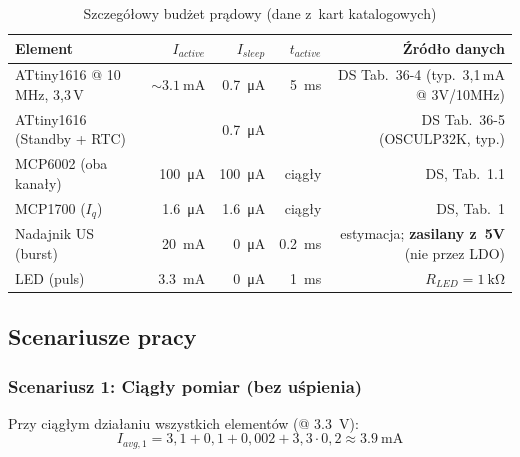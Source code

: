 \documentclass[a4paper,11pt]{article}
\begin{document}
\begin{table}[H]
    \centering
    \caption{Szczegółowy budżet prądowy (dane z~kart katalogowych)}
    \label{tab:moc_detail}
    \begin{tabular}{lrrrr}
        \toprule
        \textbf{Element} & \textbf{$I_{active}$} & \textbf{$I_{sleep}$}
            & \textbf{$t_{active}$} & \textbf{Źródło danych} \\
        \midrule
        ATtiny1616 @ 10\,MHz, 3{,}3\,V
            & ${\sim}\SI{3,1}{\milli\ampere}$
            & \SI{0,7}{\micro\ampere}
            & \SI{5}{\milli\second}
            & DS Tab.~36-4 (typ.\ 3{,}1\,mA @ 3V/10MHz) \\
        ATtiny1616 (Standby + RTC)
            &
            & \SI{0,7}{\micro\ampere}
            &
            & DS Tab.~36-5 (OSCULP32K, typ.) \\
        MCP6002 (oba kanały)
            & \SI{100}{\micro\ampere}
            & \SI{100}{\micro\ampere}
            & ciągły
            & DS, Tab.~1.1 \\
        MCP1700 ($I_q$)
            & \SI{1,6}{\micro\ampere}
            & \SI{1,6}{\micro\ampere}
            & ciągły
            & DS, Tab.~1 \\
        Nadajnik US (burst)
            & \SI{20}{\milli\ampere}
            & \SI{0}{\micro\ampere}
            & \SI{0,2}{\milli\second}
            & estymacja; \textbf{zasilany z~5V} (nie przez LDO) \\
        LED (puls)
            & \SI{3,3}{\milli\ampere}
            & \SI{0}{\micro\ampere}
            & \SI{1}{\milli\second}
            & $R_{LED} = \SI{1}{\kilo\ohm}$ \\
        \bottomrule
    \end{tabular}
\end{table}

\subsection{Scenariusze pracy}

\subsubsection{Scenariusz 1: Ciągły pomiar (bez uśpienia)}

Przy ciągłym działaniu wszystkich elementów (@ \SI{3,3}{\volt}):
\begin{equation}
    I_{avg,1} = 3{,}1 + 0{,}1 + 0{,}002 + 3{,}3 \cdot 0{,}2 \approx \SI{3,9}{\milli\ampere}
\end{equation}
\end{document}
